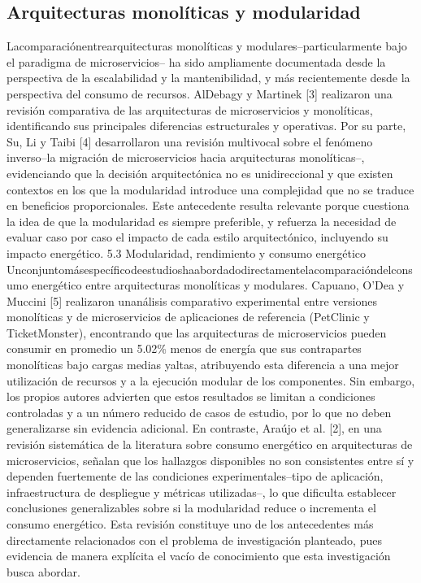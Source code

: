 \subsection{Arquitecturas monolíticas y modularidad} 
Lacomparaciónentrearquitecturas monolíticas y modulares–particularmente bajo el paradigma de microservicios– ha sido ampliamente documentada desde la perspectiva de la escalabilidad y la mantenibilidad, y más recientemente desde la perspectiva del consumo de recursos. AlDebagy y Martinek [3] realizaron una revisión comparativa de las arquitecturas de microservicios y monolíticas, identificando sus principales diferencias estructurales y operativas. Por su parte, Su, Li y Taibi [4] desarrollaron una revisión multivocal sobre el fenómeno inverso–la migración de microservicios hacia arquitecturas monolíticas–, evidenciando que la decisión arquitectónica no es unidireccional y que existen contextos en los que la modularidad introduce una complejidad que no se traduce en beneficios proporcionales. Este antecedente resulta relevante porque cuestiona la idea de que la modularidad es siempre preferible, y refuerza la necesidad de evaluar caso por caso el impacto de cada estilo arquitectónico, incluyendo su impacto energético. 5.3 Modularidad, rendimiento y consumo energético Unconjuntomásespecíficodeestudioshaabordadodirectamentelacomparacióndelconsumo energético entre arquitecturas monolíticas y modulares. Capuano, O’Dea y Muccini [5] realizaron unanálisis comparativo experimental entre versiones monolíticas y de microservicios de aplicaciones de referencia (PetClinic y TicketMonster), encontrando que las arquitecturas de microservicios pueden consumir en promedio un 5.02\% menos de energía que sus contrapartes monolíticas bajo cargas medias yaltas, atribuyendo esta diferencia a una mejor utilización de recursos y a la ejecución modular de los componentes. Sin embargo, los propios autores advierten que estos resultados se limitan a condiciones controladas y a un número reducido de casos de estudio, por lo que no deben generalizarse sin evidencia adicional. En contraste, Araújo et al. [2], en una revisión sistemática de la literatura sobre consumo energético en arquitecturas de microservicios, señalan que los hallazgos disponibles no son consistentes entre sí y dependen fuertemente de las condiciones experimentales–tipo de aplicación, infraestructura de despliegue y métricas utilizadas–, lo que dificulta establecer conclusiones generalizables sobre si la modularidad reduce o incrementa el consumo energético. Esta revisión constituye uno de los antecedentes más directamente relacionados con el problema de investigación planteado, pues evidencia de manera explícita el vacío de conocimiento que esta investigación busca abordar.


